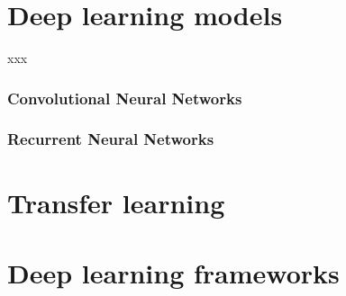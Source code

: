 \section{Deep learning models}
xxx

\subsubsection{Convolutional Neural Networks}


\subsubsection{Recurrent Neural Networks}




\section{Transfer learning}




\section{Deep learning frameworks}